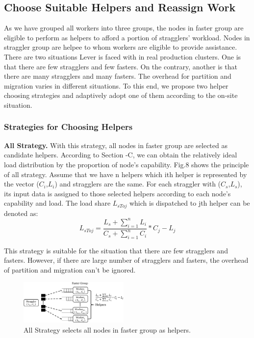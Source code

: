 \documentclass[10pt,conference,compsocconf,letterpaper]{IEEEtran}
\begin{document}
\subsection{Choose Suitable Helpers and Reassign Work}

  As we have grouped all workers into three groups, the nodes in faster group are eligible to perform as helpers to afford a portion of stragglers' workload. Nodes in straggler group are helpee to whom workers are eligible to provide assistance. There are two situations Lever is faced with in real production clusters. One is that there are few stragglers and few fasters. On the contrary, another is that there are many stragglers and many fasters. The overhead for partition and migration varies in different situations. To this end, we propose two helper choosing strategies and adaptively adopt one of them according to the on-site situation.

\subsubsection{Strategies for Choosing Helpers}

  \textbf{All Strategy.} With this strategy, all nodes in faster group are selected as candidate helpers. According to Section \uppercase\expandafter{}-C, we can obtain the relatively ideal load distribution by the proportion of node's capability. Fig.8 shows the principle of all strategy. Assume that we have n helpers which ith helper is represented by the vector (\emph{$C_i$},\emph{$L_i$}) and stragglers are the same. For each straggler with (\emph{$C_s$},\emph{$L_s$}), its input data is assigned to those selected helpers according to each node's capability and load. The load share \emph{{$L_{sToj}$}} which is dispatched to jth helper can be denoted as:
  \begin{equation}
  L_{sToj} = \frac{L_s + \sum_{i=1}^n L_i}{C_s + \sum_{i=1}^n C_i}*C_j - L_j
  \end{equation}

  This strategy is suitable for the situation that there are few stragglers and fasters. However, if there are large number of stragglers and fasters, the overhead of partition and migration can't be ignored.
  \begin{figure}[htbp]
    \centering
    \includegraphics[width=0.48\textwidth]{FigureS1}
    \caption{All Strategy selects all nodes in faster group as helpers.}
    \label{Fig. 8:}
  \end{figure}
\end{document}
